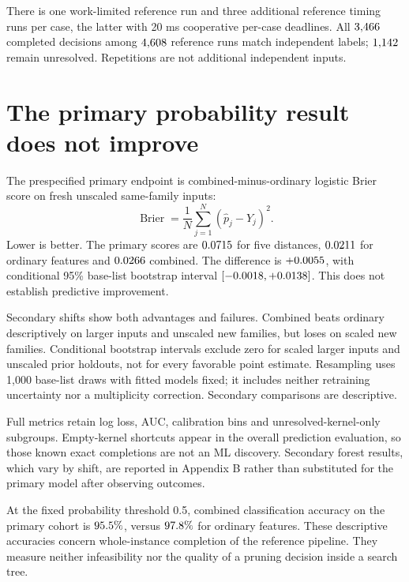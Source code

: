 \documentclass[10pt,english]{article}
\begin{document}
There is one work-limited reference run and three additional reference timing runs per case, the latter with 20 ms cooperative per-case deadlines. All \(3{,}466\) completed decisions among \(4{,}608\) reference runs match independent labels; \(1{,}142\) remain unresolved. Repetitions are not additional independent inputs.

\section{The primary probability result does not improve}
The prespecified primary endpoint is combined-minus-ordinary logistic Brier score on fresh unscaled same-family inputs:
\[
\operatorname{Brier}=\frac1N\sum_{j=1}^N(\widehat p_j-Y_j)^2.
\]
Lower is better. The primary scores are \(0.0715\) for five distances, \(0.0211\) for ordinary features and \(0.0266\) combined. The difference is \(+0.0055\), with conditional 95\% base-list bootstrap interval \([-0.0018,+0.0138]\). This does not establish predictive improvement.

\begin{table}[htbp]
\centering\small

\caption{Frozen primary-model Brier scores. Difference is combined minus ordinary. New-family membership takes cohort precedence, then prior holdout, then larger size; remaining cases are same-family. Scaling produces dependent encodings.}
\end{table}

Secondary shifts show both advantages and failures. Combined beats ordinary descriptively on larger inputs and unscaled new families, but loses on scaled new families. Conditional bootstrap intervals exclude zero for scaled larger inputs and unscaled prior holdouts, not for every favorable point estimate. Resampling uses 1,000 base-list draws with fitted models fixed; it includes neither retraining uncertainty nor a multiplicity correction. Secondary comparisons are descriptive.

Full metrics retain log loss, AUC, calibration bins and unresolved-kernel-only subgroups. Empty-kernel shortcuts appear in the overall prediction evaluation, so those known exact completions are not an ML discovery. Secondary forest results, which vary by shift, are reported in Appendix B rather than substituted for the primary model after observing outcomes.

At the fixed probability threshold 0.5, combined classification accuracy on the primary cohort is \(95.5\%\), versus \(97.8\%\) for ordinary features. These descriptive accuracies concern whole-instance completion of the reference pipeline. They measure neither infeasibility nor the quality of a pruning decision inside a search tree.
\end{document}

